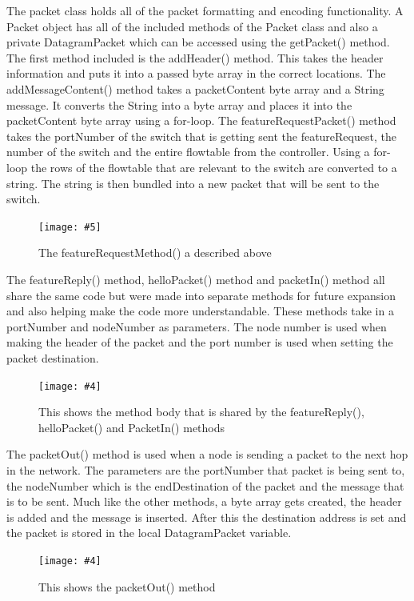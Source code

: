 \documentclass{article}
\newcommand{\includescalefigure}[5]{
\begin{figure}[htb]
\centering
\texttt{[image: \#5]}
\captionsetup{width=.8\linewidth} 
\caption[#2]{#3}
\label{#1}
\end{figure}
}
\newcommand{\includefigure}[4]{
\begin{figure}[htb]
\centering
\texttt{[image: \#4]}
\captionsetup{width=.8\linewidth} 
\caption[#2]{#3}
\label{#1}
\end{figure}
}
\begin{document}
The packet class holds all of the packet formatting and encoding functionality. A Packet object has all of the included methods of the Packet class and also a private DatagramPacket which can be accessed using the getPacket() method.
\newline
\newline
The first method included is the addHeader() method. This takes the header information and puts it into a passed byte array in the correct locations.
\newline
\newline
The addMessageContent() method takes a packetContent byte array and a String message. It converts the String into a byte array and places it into the packetContent byte array using a for-loop.
\newline
\newline
The featureRequestPacket() method takes the portNumber of the switch that is getting sent the featureRequest, the number of the switch and the entire flowtable from the controller. Using a for-loop the rows of the flowtable that are relevant to the switch are converted to a string. The string is then bundled into a new packet that will be sent to the switch.
\pagebreak
\includescalefigure{PacketFeatureRequest}{FeatureRequest Method}{The featureRequestMethod() a described above}{0.9}{Packet-FeatureRequest.PNG}

The featureReply() method, helloPacket() method and packetIn() method all share the same code but were made into separate methods for future expansion and also helping make the code more understandable.
These methods take in a portNumber and nodeNumber as parameters. The node number is used when making the header of the packet and the port number is used when setting the packet destination.
\includefigure{GeneralPacket}{GeneralPacket Method Body}{This shows the method body that is shared by the featureReply(), helloPacket() and PacketIn() methods}{General-Packet-Method.PNG}
\pagebreak

The packetOut() method is used when a node is sending a packet to the next hop in the network. The parameters are the portNumber that packet is being sent to, the nodeNumber which is the endDestination of the packet and the message that is to be sent. Much like the other methods, a byte array gets created, the header is added and the message is inserted. After this the destination address is set and the packet is stored in the local DatagramPacket variable.

\includefigure{PacketOutMethod}{PacketOutMethod}{This shows the packetOut() method}{Packet-PacketOut.PNG}
\end{document}
